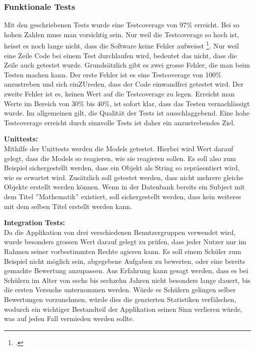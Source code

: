 \subsubsection{Funktionale Tests}
Mit den geschriebenen Tests wurde eine Testcoverage von 97\% erreicht. Bei so hohen Zahlen muss man vorsichtig sein. Nur weil die Testcoverage so hoch ist, heisst es noch lange nicht, dass die Software keine Fehler aufweisst \footcite{test_coverage}. Nur weil eine Zeile Code bei einem Test durchlaufen wird, bedeutet das nicht, dass die Zeile auch getestet wurde. Grundsätzlich gibt es zwei grosse Fehler, die man beim Testen machen kann. Der erste Fehler ist es eine Testcoverage von 100\% anzustreben und sich einZUreden, dass der Code einwandfrei getestet wird. Der zweite Fehler ist es, keinen Wert auf die Testcoverage zu legen. Erreicht man Werte im Bereich von 30\% bis 40\%, ist sofort klar, dass das Testen vernachlässigt wurde. Im allgemeinen gilt, die Qualität der Tests ist ausschlaggebend. Eine hohe Testcoverage erreicht durch sinnvolle Tests ist daher ein anzustrebendes Ziel. 

\textbf{Unittests:} \\
Mithilfe der Unittests werden die Models getestet. Hierbei wird Wert darauf gelegt, dass die Models so reagieren, wie sie reagieren sollen. Es soll also zum Beispiel sichergestellt werden, dass ein Objekt als String so repräsentiert wird, wie es erwartet wird. Zusätzlich soll getestet werden, dass nicht mehrere gleiche Objekte erstellt werden können. Wenn in der Datenbank bereits ein Subject mit dem Titel ''Mathematik'' existiert, soll sichergestellt werden, dass kein weiteres mit dem selben Titel erstellt werden kann.

\textbf{Integration Tests:} \\
Da die Applikation von drei verschiedenen Benutzergruppen verwendet wird, wurde besonders grossen Wert darauf gelegt zu prüfen, dass jeder Nutzer nur im Rahmen seiner vorbestimmten Rechte agieren kann. Es soll einem Schüler zum Beispiel nicht möglich sein, abgegebene Aufgaben zu bewerten, oder eine bereits gemachte Bewertung anzupassen. Aus Erfahrung kann gesagt werden, dass es bei Schülern im Alter von sechs bis sechzehn Jahren nicht besonders lange dauert, bis die ersten Versuche unternommen werden. Würde es Schülern gelingen selber Bewertungen vorzunehmen, würde dies die genrierten Statistiken verfälschen, wodurch ein wichtiger Bestandteil der Applikation seinen Sinn verlieren würde, was auf jeden Fall vermieden werden sollte. 

